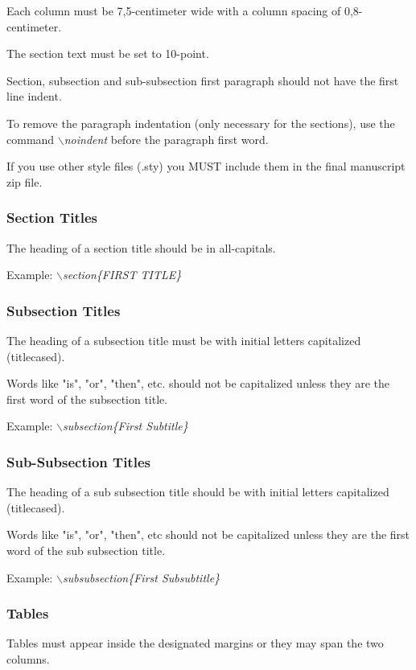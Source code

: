 \documentclass[a4paper,twoside]{article}
\begin{document}
Each column must be 7,5-centimeter wide with a column spacing
of 0,8-centimeter.

The section text must be set to 10-point.

Section, subsection and sub-subsection first paragraph should not
have the first line indent.

To remove the paragraph indentation (only necessary for the
sections), use the command \textit{$\backslash$noindent} before the
paragraph first word.

If you use other style files (.sty) you MUST include them in the
final manuscript zip file.

\subsubsection{Section Titles}

The heading of a section title should be in all-capitals.

Example: \textit{$\backslash$section\{FIRST TITLE\}}

\vfill
\subsubsection{Subsection Titles}

The heading of a subsection title must be with initial letters
capitalized (titlecased).

Words like "is", "or", "then", etc. should not be capitalized unless
they are the first word of the subsection title.

Example: \textit{$\backslash$subsection\{First Subtitle\}}

\subsubsection{Sub-Subsection Titles}

The heading of a sub subsection title should be with initial letters
capitalized (titlecased).

Words like "is", "or", "then", etc should not be capitalized unless
they are the first word of the sub subsection title.

Example: \textit{$\backslash$subsubsection\{First Subsubtitle\}}

\subsubsection{Tables}

Tables must appear inside the designated margins or they may span
the two columns.
\end{document}
